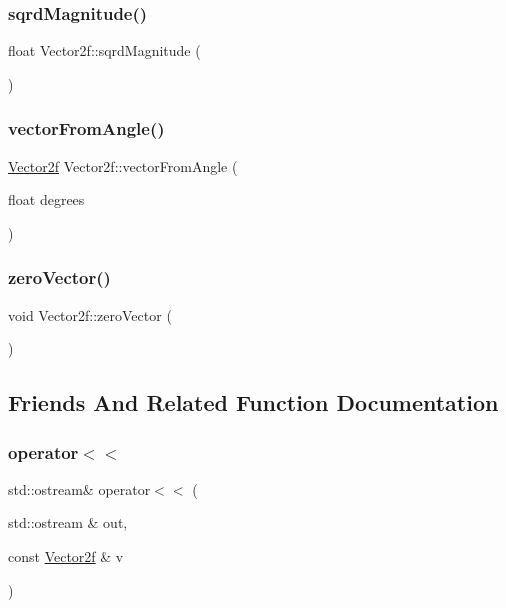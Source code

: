 \subsubsection{\texorpdfstring{sqrdMagnitude()}{sqrdMagnitude()}}
{\footnotesize\ttfamily float Vector2f\+::sqrd\+Magnitude (\begin{DoxyParamCaption}{ }\end{DoxyParamCaption})}

\mbox{\label{class_vector2f_a2a036b477c45120487577a9079acdac4}} 
\subsubsection{\texorpdfstring{vectorFromAngle()}{vectorFromAngle()}}
{\footnotesize\ttfamily \mbox{\hyperlink{class_vector2f}{Vector2f}} Vector2f\+::vector\+From\+Angle (\begin{DoxyParamCaption}\item[{float}]{degrees }\end{DoxyParamCaption})}

\mbox{\label{class_vector2f_ab3f811f694179f670ea6cd7136864aca}} 
\subsubsection{\texorpdfstring{zeroVector()}{zeroVector()}}
{\footnotesize\ttfamily void Vector2f\+::zero\+Vector (\begin{DoxyParamCaption}{ }\end{DoxyParamCaption})}



\subsection{Friends And Related Function Documentation}
\mbox{\label{class_vector2f_a957a07113aed7ba18d2e3f63894a55a5}} 
\subsubsection{\texorpdfstring{operator$<$$<$}{operator<<}}
{\footnotesize\ttfamily std\+::ostream\& operator$<$$<$ (\begin{DoxyParamCaption}\item[{std\+::ostream \&}]{out,  }\item[{const \mbox{\hyperlink{class_vector2f}{Vector2f}} \&}]{v }\end{DoxyParamCaption})\hspace{0.3cm}{\ttfamily [friend]}}



